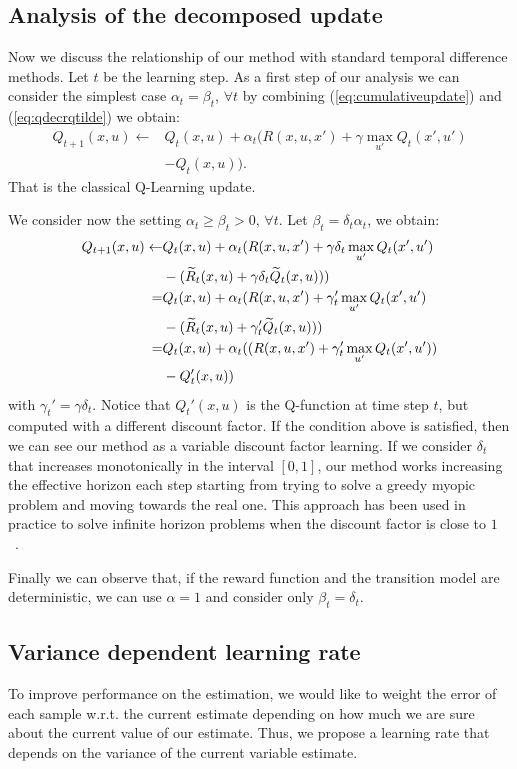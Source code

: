 \documentclass[conference]{IEEEtran}
\begin{document}
\subsection{Analysis of the decomposed update}
Now we discuss the relationship of our method with standard temporal difference methods. Let $t$ be the learning step. As a first step of our analysis we can consider the simplest case $\alpha_t=\beta_t$, $\forall t$ by combining (\ref{eq:cumulativeupdate}) and (\ref{eq:qdecrqtilde}) we obtain:
\begin{align}
Q_{t+1}(x,u) \leftarrow & Q_t(x,u)+\alpha_t(R(x,u,x')+\gamma\max_{u'}Q_t(x',u')\nonumber\\
 & - Q_t(x,u)).
\end{align}
That is the classical Q-Learning update. 

We consider now the setting $\alpha_t\geq\beta_t>0$, $\forall t$. Let $\beta_t=\delta_t\alpha_t$, we obtain:
\begin{align}
Q_{t+1}(x,u) \leftarrow & Q_t(x,u)+\alpha_t(R(x,u,x')+\gamma\delta_t \max_{u'}Q_t(x',u') \nonumber\\
  & -(\widetilde{R}_t(x,u)+\gamma\delta_t\widetilde{Q}_t(x,u))) \nonumber\\
= & Q_t(x,u)+\alpha_t(R(x,u,x')+\gamma_t'\max_{u'}Q_t(x',u') \nonumber\\
  & -(\widetilde{R}_t(x,u)+\gamma_t'\widetilde{Q}_t(x,u))) \nonumber\\
= & Q_t(x,u)+\alpha_t((R(x,u,x')+\gamma_t'\max_{u'}Q_t(x',u')) \nonumber\\
  & - Q_t'(x,u))
\end{align}
with $\gamma_t'=\gamma\delta_t$. Notice that $Q_t'(x,u)$ is the Q-function at time step $t$, but computed with a different discount factor. If the condition above is satisfied, then we can see our method as a variable discount factor learning. If we consider $\delta_t$ that increases monotonically in the interval $[0,1]$, our method works increasing the effective horizon each step starting from trying to solve a greedy myopic problem and moving towards the real one. This approach has been used in practice to solve infinite horizon problems when the discount factor is close to $1$ ~\cite{crites1996improving, bao2008infinite, franccois2015discount}.

Finally we can observe that, if the reward function and the transition model are deterministic, we can use $\alpha=1$ and consider only $\beta_t=\delta_t$.
\subsection{Variance dependent learning rate}
To improve performance on the estimation, we would like to weight the error of each sample w.r.t. the current estimate depending on how much we are sure about the current value of our estimate. Thus, we propose a learning rate that depends on the variance of the current variable estimate.
\end{document}
